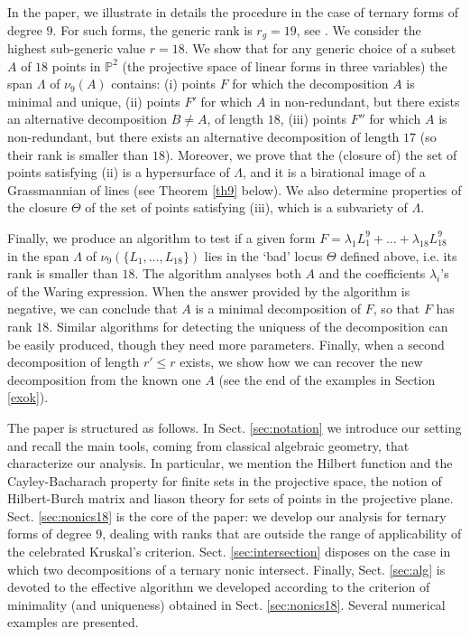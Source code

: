 \documentclass{amsart}
\newcommand{\Pj}{\mathbb{P}}
\theoremstyle{definition}
\begin{document}
In the paper, we illustrate in details the procedure in the case of ternary forms of degree $9$. For such forms, the generic rank
is $r_g=19$, see \cite{AlexHir95}. We consider the highest sub-generic value $r=18$. We show that for any generic choice of a subset $A$ of $18$ points
in $\Pj^2$ (the projective space of linear forms in three variables) the span $\Lambda$ of $\nu_9(A)$ contains: (i) points $F$
for which the decomposition $A$ is minimal and unique, (ii) points $F'$ for which $A$ in non-redundant, but there exists
an alternative decomposition $B\neq A$, of length $18$, (iii) points $F''$ for which $A$ is non-redundant, but there exists
an alternative decomposition of length $17$ (so their rank is smaller than $18$). Moreover, we prove that the (closure of) the
set of points satisfying (ii)  is a  hypersurface  of $\Lambda$, 
and it is a birational image of a Grassmannian of lines (see Theorem \ref{th9} below). We also determine properties of the closure $\Theta$
of the set of points satisfying (iii), which is a subvariety of $\Lambda$.

Finally, we produce an algorithm to test if  a given form $ F= \lambda_1L_1^9+\dots +\lambda_{18}L_{18}^9$ in the span $\Lambda$
of $\nu_9(\{L_1, \dots, L_{18}\})$ lies in the `bad' locus $\Theta$ defined above, i.e. its rank is smaller than $18$. 
The algorithm analyses both $A$ and the coefficients $\lambda_i$'s of the Waring expression. 
When the answer provided by the algorithm is negative, we can conclude that
$A$ is a minimal decomposition of $F$, so that $F$ has rank $18$. 
Similar algorithms for detecting the uniquess of the decomposition can be easily produced, though they need
more parameters. Finally, when a second decomposition of length $r'\leq r$ exists, we show how we can recover the new decomposition
from the known one $A$ (see the end of the examples in Section \ref{exok}).

The paper is structured as follows. In Sect. \ref{sec:notation} we introduce our setting and recall the main tools, coming from 
classical algebraic geometry, that characterize our analysis. In particular, we mention the Hilbert function and the Cayley-Bacharach 
property for finite sets in the projective space, the notion of Hilbert-Burch matrix and liason theory for sets of points in the projective plane. 
Sect. \ref{sec:nonics18} is the core of the paper: we develop our analysis for ternary forms of degree $ 9 $, dealing with ranks that are outside 
the range of applicability of the celebrated Kruskal's criterion. Sect. \ref{sec:intersection} disposes on the case in which two decompositions of a ternary nonic intersect. Finally, Sect. \ref{sec:alg} is devoted to the effective algorithm we developed 
according to the criterion of minimality (and uniqueness) obtained in Sect. \ref{sec:nonics18}. Several numerical examples are presented.
\smallskip
\end{document}

